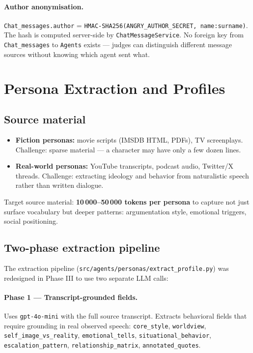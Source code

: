 \documentclass[12pt,a4paper]{article}
\begin{document}
\paragraph{Author anonymisation.}
\texttt{Chat\_messages.author} = \texttt{HMAC-SHA256(ANGRY\_AUTHOR\_SECRET, name:surname)}.
The hash is computed server-side by \texttt{ChatMessageService}. No foreign key from
\texttt{Chat\_messages} to \texttt{Agents} exists --- judges can distinguish different
message sources without knowing which agent sent what.

\section{Persona Extraction and Profiles}

\subsection{Source material}

\begin{itemize}
  \item \textbf{Fiction personas:} movie scripts (IMSDB HTML, PDFs), TV screenplays.
        Challenge: sparse material --- a character may have only a few dozen lines.
  \item \textbf{Real-world personas:} YouTube transcripts, podcast audio, Twitter/X threads.
        Challenge: extracting ideology and behavior from naturalistic speech rather than
        written dialogue.
\end{itemize}

Target source material: \textbf{10\,000--50\,000 tokens per persona} to capture not just
surface vocabulary but deeper patterns: argumentation style, emotional triggers, social
positioning.

\subsection{Two-phase extraction pipeline}

The extraction pipeline (\texttt{src/agents/personas/extract\_profile.py}) was redesigned
in Phase III to use two separate LLM calls:

\paragraph{Phase 1 --- Transcript-grounded fields.}
Uses \texttt{gpt-4o-mini} with the full source transcript. Extracts behavioral fields
that require grounding in real observed speech: \texttt{core\_style}, \texttt{worldview},
\texttt{self\_image\_vs\_reality}, \texttt{emotional\_tells}, \texttt{situational\_behavior},
\texttt{escalation\_pattern}, \texttt{relationship\_matrix}, \texttt{annotated\_quotes}.
\end{document}
